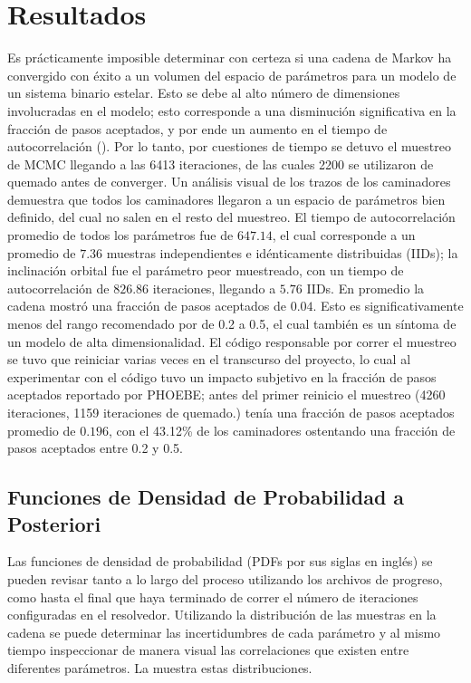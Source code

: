 \section{Resultados} \label{metodologia:modelocomputacional:resultados}

Es prácticamente imposible determinar con certeza si una cadena de Markov ha
convergido con éxito a un volumen del espacio de parámetros para un modelo de un
sistema binario estelar. Esto se debe al alto número de dimensiones involucradas
en el modelo; esto corresponde a una disminución significativa en la fracción de
pasos aceptados, y por ende un aumento en el tiempo de autocorrelación
(). Por lo tanto, por
cuestiones de tiempo se detuvo el muestreo de MCMC llegando a las 6413
iteraciones, de las cuales 2200 se utilizaron de quemado antes de converger. Un
análisis visual de los trazos de los caminadores demuestra que todos los
caminadores llegaron a un espacio de parámetros bien definido, del cual no salen
en el resto del muestreo. El tiempo de autocorrelación promedio de todos los
parámetros fue de $647.14$, el cual corresponde a un promedio de $7.36$ muestras
independientes e idénticamente distribuidas (IIDs); la inclinación orbital fue
el parámetro peor muestreado, con un tiempo de autocorrelación de $826.86$
iteraciones, llegando a $5.76$ IIDs. En promedio la cadena mostró una fracción
de pasos aceptados de $0.04$. Esto es significativamente menos del rango
recomendado por  de 0.2 a 0.5, el cual
también es un síntoma de un modelo de alta dimensionalidad. El código
responsable por correr el muestreo se tuvo que reiniciar varias veces en el
transcurso del proyecto, lo cual al experimentar con el código tuvo un impacto
subjetivo en la fracción de pasos aceptados reportado por PHOEBE; antes del
primer reinicio el muestreo (4260 iteraciones, 1159 iteraciones de quemado.)
tenía una fracción de pasos aceptados promedio de $0.196$, con el 43.12\% de los
caminadores ostentando una fracción de pasos aceptados entre 0.2 y 0.5. 

\subsection{Funciones de Densidad de Probabilidad a Posteriori} \label{metodologia:modelocomputacional:mcmc:resultados}

Las funciones de densidad de probabilidad (PDFs por sus siglas en inglés) se
pueden revisar tanto a lo largo del proceso utilizando los archivos de progreso,
como hasta el final que haya terminado de correr el número de iteraciones
configuradas en el resolvedor. Utilizando la distribución de las muestras en la
cadena se puede determinar las incertidumbres de cada parámetro y al mismo
tiempo inspeccionar de manera visual las correlaciones que existen entre
diferentes parámetros. La  muestra
estas distribuciones.

